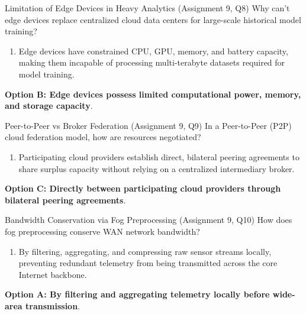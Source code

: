 \begin{solved}{Limitation of Edge Devices in Heavy Analytics (Assignment 9, Q8)}
\Given Why can't edge devices replace centralized cloud data centers for large-scale historical model training?
\Steps
\begin{enumerate}[leftmargin=*]
  \item Edge devices have constrained CPU, GPU, memory, and battery capacity, making them incapable of processing multi-terabyte datasets required for model training.
\end{enumerate}
\Answer \textbf{Option B: Edge devices possess limited computational power, memory, and storage capacity}.
\end{solved}

\begin{solved}{Peer-to-Peer vs Broker Federation (Assignment 9, Q9)}
\Given In a Peer-to-Peer (P2P) cloud federation model, how are resources negotiated?
\Steps
\begin{enumerate}[leftmargin=*]
  \item Participating cloud providers establish direct, bilateral peering agreements to share surplus capacity without relying on a centralized intermediary broker.
\end{enumerate}
\Answer \textbf{Option C: Directly between participating cloud providers through bilateral peering agreements}.
\end{solved}

\begin{solved}{Bandwidth Conservation via Fog Preprocessing (Assignment 9, Q10)}
\Given How does fog preprocessing conserve WAN network bandwidth?
\Steps
\begin{enumerate}[leftmargin=*]
  \item By filtering, aggregating, and compressing raw sensor streams locally, preventing redundant telemetry from being transmitted across the core Internet backbone.
\end{enumerate}
\Answer \textbf{Option A: By filtering and aggregating telemetry locally before wide-area transmission}.
\end{solved}

